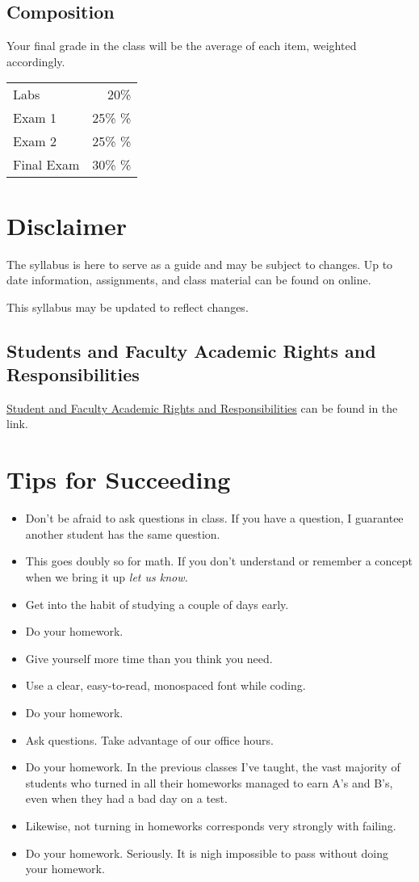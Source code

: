 \documentclass[10pt, letter]{article}
\begin{document}
\subsection*{Composition}
Your final grade in the class will be the average of each item, weighted accordingly.

\begin{tabular}{ l  r }
	Labs & 20\% \\
	Exam 1 & 25\% \% \\
	Exam 2 & 25\% \% \\
    Final  Exam & 30\% \% \\
\end{tabular}

\section{Disclaimer}
The syllabus is here to serve as a guide and may be subject to changes.  Up to date information, assignments, and class material can be found on online.

This syllabus may be updated to reflect changes.


\subsection*{Students and Faculty Academic Rights and Responsibilities}
\href{http://policies.temple.edu/PDF/99.pdf}{Student and Faculty Academic Rights and Responsibilities} can be found in the link.




\section{Tips for Succeeding}
\begin{itemize}
	\item Don't be afraid to ask questions in class.  If you have a question, I guarantee another student has the same question.  
	\item This goes doubly so for math.  If you don't understand or remember a concept when we bring it up \emph{let us know.}
	\item Get into the habit of studying a couple of days early.
	\item Do your homework.
	\item Give yourself more time than you think you need.
	\item Use a clear, easy-to-read, monospaced font while coding.
	\item Do your homework.
	\item Ask questions.  Take advantage of our office hours.
	\item Do your homework.  In the previous classes I've taught, the vast majority of students who turned in all their homeworks managed to earn A's and B's, even when they had a bad day on a test.
	\item Likewise, not turning in homeworks corresponds very strongly with failing.
	\item Do your homework. Seriously.  It is nigh impossible to pass without doing your homework.
	
	
\end{itemize}
\end{document}
